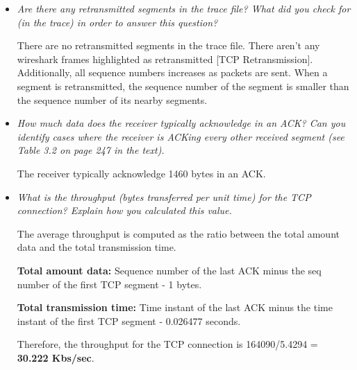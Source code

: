 \documentclass[11pt]{article}
\begin{document}
\begin{itemize}
	\item
		\textit{Are there any retransmitted segments in the trace file? What did you check for (in the trace)
in order to answer this question?}
		\par There are no retransmitted segments in the trace file. There aren't any wireshark frames highlighted as retransmitted [TCP Retransmission]. Additionally, all sequence numbers increases as packets are sent. When a segment is retransmitted, the sequence number of the segment is smaller than the sequence number of its nearby segments.
		
	\item
		\textit{How much data does the receiver typically acknowledge in an ACK? Can you identify cases
where the receiver is ACKing every other received segment (see Table 3.2 on page 247 in the
text).}
		\par The receiver typically acknowledge 1460 bytes in an ACK.
		
	\item
		\textit{What is the throughput (bytes transferred per unit time) for the TCP connection? Explain how
you calculated this value.}
		\par The average throughput is computed as the ratio between the total amount data and the total transmission time.
		\newline
		
		\par \textbf{Total amount data:}
		\newline Sequence number of the last ACK minus the seq number of the first TCP segment
		 - 1
		 bytes.
		\newline
		
		\par \textbf{Total transmission time:}
		\newline Time instant of the last ACK minus the time instant of the first TCP segment
		 - 0.026477
		 seconds.
		\newline
		
		\par Therefore, the throughput for the TCP connection is 164090/5.4294 = \textbf{30.222 Kbs/sec}.

\end{itemize}

\pagebreak
\end{document}
